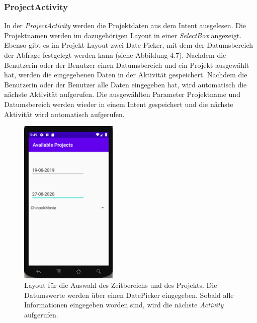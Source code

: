 \subsubsection{ProjectActivity}
In der \textit{ProjectActivity} werden die Projektdaten aus dem Intent ausgelesen. Die Projektnamen werden im dazugehörigen Layout in einer \textit{SelectBox} angezeigt. Ebenso gibt es im Projekt-Layout zwei Date-Picker, mit dem der Datumsbereich der Abfrage festgelegt werden kann (siehe Abbildung 4.7). Nachdem die Benutzerin oder der Benutzer einen Datumsbereich und ein Projekt ausgewählt hat, werden die eingegebenen Daten in der Aktivität gespeichert. Nachdem die Benutzerin oder der Benutzer alle Daten eingegeben hat, wird automatisch die nächste Aktivität aufgerufen. Die ausgewählten Parameter Projektname und Datumsbereich werden wieder in einem Intent gespeichert und die nächste Aktivität wird automatisch aufgerufen.
\begin{figure}[tp]
  \centering
  \includegraphics[height=8cm]{images/anroidProjectScreen.PNG}
 \caption[Layout für die Auswahl des Zeitbereichs und des Projekts]{Layout für die Auswahl des Zeitbereichs und des Projekts. Die Datumswerte werden über einen DatePicker eingegeben. Sobald alle Informationen eingegeben worden sind, wird die nächste \textit{Activity} aufgerufen.}
  \label{fig:findingsInIDE}
\end{figure}

